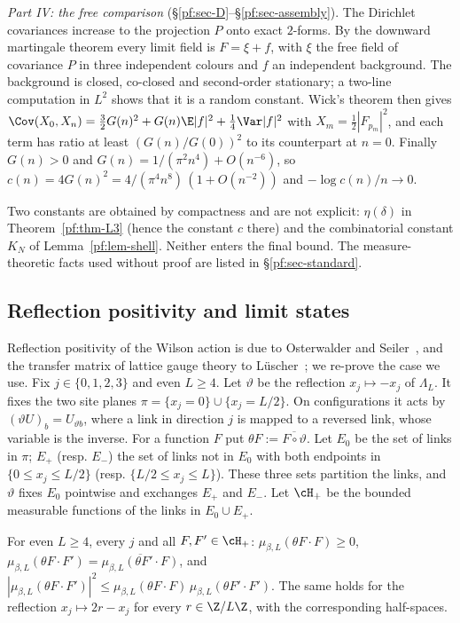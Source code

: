 \emph{Part IV: the free comparison} (\S\ref{pf:sec-D}--\S\ref{pf:sec-assembly}). The Dirichlet covariances increase to the projection $P$ onto exact $2$-forms. By the downward martingale theorem every limit field is $F=\xi+f$, with $\xi$ the free field of covariance $P$ in three independent colours and $f$ an independent background. The background is closed, co-closed and second-order stationary; a two-line computation in $L^2$ shows that it is a random constant. Wick's theorem then gives
$\Cov(X_0,X_n)=\tfrac32G(n)^2+G(n)\E|f|^2+\tfrac14\Var|f|^2$ with $X_m=\tfrac12|F_{p_m}|^2$, and each term has ratio at least $(G(n)/G(0))^2$ to its counterpart at $n=0$. Finally $G(n)>0$ and $G(n)=1/(\pi^2n^4)+O(n^{-6})$, so $c(n)=4G(n)^2=4/(\pi^4n^8)\,(1+O(n^{-2}))$ and $-\log c(n)/n\to0$.

Two constants are obtained by compactness and are not explicit: $\eta(\delta)$ in Theorem~\ref{pf:thm-L3} (hence the constant $c$ there) and the combinatorial constant $K_N$ of Lemma~\ref{pf:lem-shell}. Neither enters the final bound. The measure-theoretic facts used without proof are listed in \S\ref{pf:sec-standard}.

\subsection{Reflection positivity and limit states}\label{pf:sec-rp}

Reflection positivity of the Wilson action is due to Osterwalder and Seiler~\cite{OS78}, and the transfer matrix of lattice gauge theory to L\"uscher~\cite{Lu77}; we re-prove the case we use. Fix $j\in\{0,1,2,3\}$ and even $L\ge4$. Let $\vartheta$ be the reflection $x_j\mapsto-x_j$ of $\Lambda_L$. It fixes the two site planes $\pi=\{x_j=0\}\cup\{x_j=L/2\}$. On configurations it acts by $(\vartheta U)_{b}=U_{\vartheta b}$, where a link in direction $j$ is mapped to a reversed link, whose variable is the inverse. For a function $F$ put $\theta F:=\overline{F\circ\vartheta}$.
Let $E_0$ be the set of links in $\pi$; $E_+$ (resp. $E_-$) the set of links not in $E_0$ with both endpoints in $\{0\le x_j\le L/2\}$ (resp. $\{L/2\le x_j\le L\}$). These three sets partition the links, and $\vartheta$ fixes $E_0$ pointwise and exchanges $E_+$ and $E_-$. Let $\cH_+$ be the bounded measurable functions of the links in $E_0\cup E_+$.

\begin{lemma}\label{pf:lem-rp}
For even $L\ge4$, every $j$ and all $F,F'\in\cH_+$: $\mu_{\beta,L}(\theta F\cdot F)\ge0$, $\mu_{\beta,L}(\theta F\cdot F')=\overline{\mu_{\beta,L}(\theta F'\cdot F)}$, and $|\mu_{\beta,L}(\theta F\cdot F')|^2\le\mu_{\beta,L}(\theta F\cdot F)\,\mu_{\beta,L}(\theta F'\cdot F')$. The same holds for the reflection $x_j\mapsto2r-x_j$ for every $r\in\Z/L\Z$, with the corresponding half-spaces.
\end{lemma}

